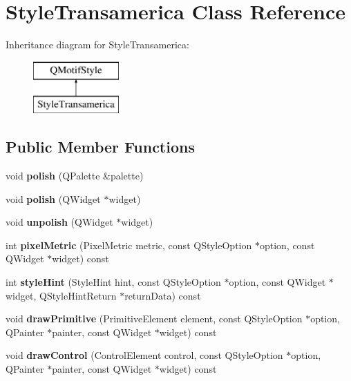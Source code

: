 \section{Style\-Transamerica Class Reference}
\label{class_style_transamerica}
Inheritance diagram for Style\-Transamerica\-:\begin{figure}[H]
\begin{center}
\leavevmode
\includegraphics[height=2.000000cm]{class_style_transamerica}
\end{center}
\end{figure}
\subsection*{Public Member Functions}
\begin{DoxyCompactItemize}
\item 
void {\bf polish} (Q\-Palette \&palette)
\item 
void {\bfseries polish} (Q\-Widget $\ast$widget)\label{class_style_transamerica_a54ce3ea810836d631a7e2300f30827f2}

\item 
void {\bfseries unpolish} (Q\-Widget $\ast$widget)\label{class_style_transamerica_ac8068bb19ee5da7362da3f2966ab1db1}

\item 
int {\bfseries pixel\-Metric} (Pixel\-Metric metric, const Q\-Style\-Option $\ast$option, const Q\-Widget $\ast$widget) const \label{class_style_transamerica_a25c7c0ee819ad59f71e8fb16d08b6149}

\item 
int {\bfseries style\-Hint} (Style\-Hint hint, const Q\-Style\-Option $\ast$option, const Q\-Widget $\ast$widget, Q\-Style\-Hint\-Return $\ast$return\-Data) const \label{class_style_transamerica_a8fc07db98b1efb7e1f56cff67b2c2f84}

\item 
void {\bfseries draw\-Primitive} (Primitive\-Element element, const Q\-Style\-Option $\ast$option, Q\-Painter $\ast$painter, const Q\-Widget $\ast$widget) const \label{class_style_transamerica_addeaf06690b88834a47e0c400558cf58}

\item 
void {\bfseries draw\-Control} (Control\-Element control, const Q\-Style\-Option $\ast$option, Q\-Painter $\ast$painter, const Q\-Widget $\ast$widget) const \label{class_style_transamerica_aae24517fd40bf1d902709121d5933508}

\end{DoxyCompactItemize}


